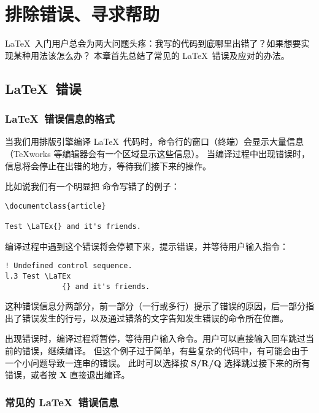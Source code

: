 \long{}

\chapter{排除错误、寻求帮助}\label{chap:error-helps}

\begin{intro}
\LaTeX\ 入门用户总会为两大问题头疼：我写的代码到底哪里出错了？如果想要实现某种用法该怎么办？
本章首先总结了常见的 \LaTeX\ 错误及应对的办法。
\end{intro}

\section{\LaTeX\ 错误}\label{sec:errors}

\subsection{\LaTeX\ 错误信息的格式}\label{subsec:errmsg}

当我们用排版引擎编译 \LaTeX\ 代码时，命令行的窗口（终端）会显示大量信息（\TeX works 等编辑器会有一个区域显示这些信息）。
当编译过程中出现错误时，信息将会停止在出错的地方，等待我们接下来的操作。

比如说我们有一个明显把  命令写错了的例子：
\begin{verbatim}
\documentclass{article}

Test \LaTEx{} and it's friends.

\end{verbatim}

编译过程中遇到这个错误将会停顿下来，提示错误，并等待用户输入指令：
\begin{verbatim}
! Undefined control sequence.
l.3 Test \LaTEx
             {} and it's friends.
\end{verbatim}

这种错误信息分两部分，前一部分（一行或多行）提示了错误的原因，后一部分指出了错误发生的行号，以及通过错落的文字告知发生错误的命令所在位置。

出现错误时，编译过程将暂停，等待用户输入命令。用户可以直接输入回车跳过当前的错误，继续编译。
但这个例子过于简单，有些复杂的代码中，有可能会由于一个小问题导致一连串的错误。
此时可以选择按 \textbf{S/R/Q} 选择跳过接下来的所有错误，或者按 \textbf{X} 直接退出编译。

\subsection{常见的 \LaTeX\ 错误信息}\label{subsec:generic-error}

